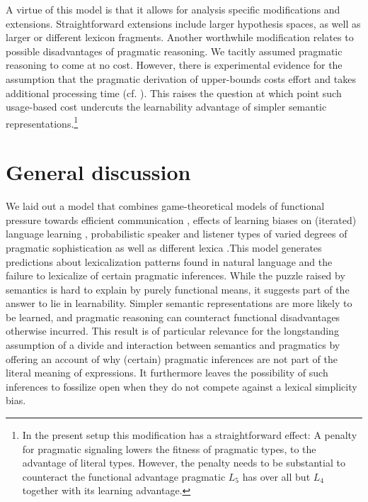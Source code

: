 \documentclass[a4paper]{article}
\begin{document}
A virtue of this model is that it allows for analysis specific modifications and extensions. Straightforward extensions include larger hypothesis spaces, as well as larger or different lexicon fragments. Another worthwhile modification relates to possible disadvantages of pragmatic reasoning. We tacitly assumed pragmatic reasoning to come at no cost. However, there is experimental evidence for the assumption that the pragmatic derivation of upper-bounds costs effort and takes additional processing time (cf. \citealt{deNeys+schaeken:2007, huang+snedeker:2009}). This raises the question at which point such usage-based cost undercuts the learnability advantage of simpler semantic representations.\footnote{In the present setup this modification has a straightforward effect: A penalty for pragmatic signaling lowers the fitness of pragmatic types, to the advantage of literal types. However, the penalty needs to be substantial to counteract the functional advantage pragmatic $L_5$ has over all but $L_4$ together with its learning advantage.}


\section{General discussion}
We laid out a model that combines game-theoretical models of functional pressure towards efficient communication \citep{nowak+krakauer:1999}, effects of learning biases on (iterated) language learning \citep{griffiths+kalish:2007}, probabilistic speaker and listener types of varied degrees of pragmatic sophistication \citep{frank+goodman:2012, franke+jaeger:2014} as well as different lexica \citep{bergen+etal:2012,bergen+etal:2016}.This model generates predictions about  lexicalization patterns found in natural language and the failure to lexicalize of certain pragmatic inferences. While the puzzle raised by semantics is hard to explain by purely functional means, it suggests part of the answer to lie in learnability. Simpler semantic representations are more likely to be learned, and pragmatic reasoning can counteract functional disadvantages otherwise incurred. This result is of particular relevance for the longstanding assumption of a divide and interaction between semantics and pragmatics by offering an account of why (certain) pragmatic inferences are not part of the literal meaning of expressions. It furthermore leaves the possibility of such inferences to fossilize open when they do not compete against a lexical simplicity bias.

\end{document}
